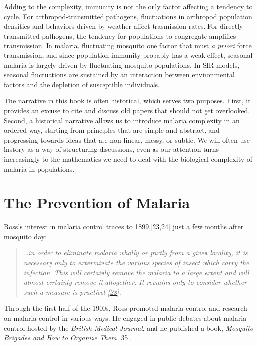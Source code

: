 \documentclass[
]{book}
\begin{document}
Adding to the complexity, immunity is not the only factor affecting a tendency to cycle.
For arthropod-transmitted pathogens, fluctuations in arthropod population densities and behaviors driven by weather affect trasmission rates.
For directly transmitted pathogens, the tendency for populations to congregate amplifies transmission.
In malaria, fluctuating mosquito one factor that must \emph{a priori} force transmission, and since population immunity probably has a weak effect,
seasonal malaria is largely driven by fluctuating mosquito populations.
In SIR models, seasonal fluctuations are sustained by an interaction between environmental factors and the depletion of susceptible individuals.

The narrative in this book is often historical, which serves two purposes.
First, it provides an excuse to cite and discuss old papers that should not get overlooked.
Second, a historical narrative allows us to introduce malaria complexity in an ordered way, starting from principles that are simple and abstract, and progressing towards ideas that are non-linear, messy, or subtle.
We will often use history as a way of structuring discussions, even as our attention turns increasingly to the mathematics we need to deal with the biological complexity of malaria in populations.

\hypertarget{the-prevention-of-malaria}{%
\section{The Prevention of Malaria}\label{the-prevention-of-malaria}}

Ross's interest in malaria control traces to 1899,{[}\protect\hyperlink{ref-RossR1899ExterminationMalaria}{23},\protect\hyperlink{ref-RossR1899InauguralLecture}{24}{]} just a few months after mosquito day:

\begin{quote}
\emph{\ldots in order to eliminate malaria wholly or partly from a given locality, it is necessary only to exterminate the various species of insect which carry the infection. This will certainly remove the malaria to a large extent and will almost certainly remove it altogether. It remains only to consider whether such a measure is practical {[}\protect\hyperlink{ref-RossR1899ExterminationMalaria}{23}{]}.}
\end{quote}

Through the first half of the 1900s, Ross promoted malaria control and research on malaria control in various ways. He engaged in public debates about malaria control hosted by the \emph{British Medical Journal}, and he published a book, \emph{Mosquito Brigades and How to Organize Them} {[}\protect\hyperlink{ref-RossR1902MosquitoBrigades}{35}{]}.
\end{document}
